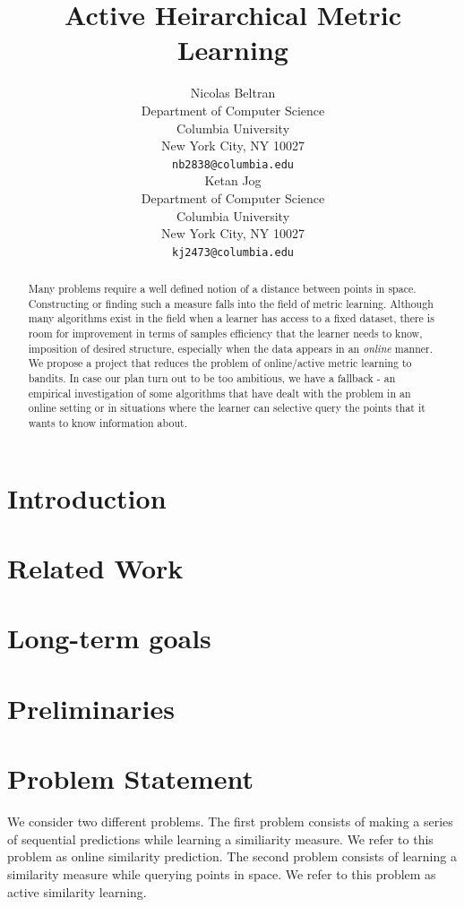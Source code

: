 \documentclass{article}
\title{Active Heirarchical Metric Learning}
\author{
  Nicolas Beltran\\
  Department of Computer Science\\
  Columbia University\\
  New York City, NY 10027 \\
  \texttt{nb2838@columbia.edu}\\
  \And
  Ketan Jog\\
  Department of Computer Science\\
  Columbia University\\
  New York City, NY 10027 \\
  \texttt{kj2473@columbia.edu}\\
}
\begin{document}
\maketitle

\begin{abstract}
    Many problems require a well defined notion of a distance between points in space.
    Constructing or finding such a measure falls into the field of metric learning.
    Although many algorithms exist in the field when a learner has access to a fixed dataset,  there is room for improvement in terms of samples efficiency that the learner needs to know, imposition of desired structure, especially when the data appears in an \textit{online} manner.
    We propose a project that reduces the problem of online/active metric learning to bandits. In case our plan turn out to be too ambitious, we have a fallback - an empirical investigation of some algorithms that have dealt with the problem in an online setting or in situations where the learner can selective query the points that it wants to know information about.
\end{abstract}


\section{Introduction}

\section{Related Work}

\section{Long-term goals}

\section{Preliminaries}


\section{Problem Statement}
\label{problem-statement}
We consider two different problems.
The first problem consists of making a series of sequential predictions while learning a
similiarity measure. We refer to this problem as online similarity prediction.
The second problem consists of learning a similarity measure while querying points in space.
We refer to this problem as active similarity learning.
\end{document}
